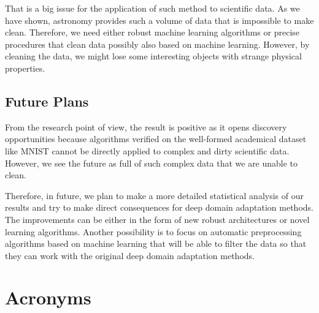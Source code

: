 \documentclass[thesis=M,english]{FITthesis}[2012/10/20]
\begin{document}
That is a big issue for the application of such method to scientific data.
As we have shown, astronomy provides such a volume of data that is impossible to make clean.
Therefore, we need either robust machine learning algorithms or precise procedures
that clean data possibly also based on machine learning.
However, by cleaning the data, we might lose some interesting objects with strange physical properties.

\section{Future Plans}

From the research point of view, the result is positive as it opens discovery opportunities because algorithms verified on the well-formed academical dataset like MNIST cannot be directly applied to complex and dirty scientific data. However, we see the future as full of such complex data that we are unable to clean.

Therefore, in future, we plan to make a more detailed statistical analysis of our results and try to make direct consequences for deep domain adaptation methods. The improvements can be either in the form of new robust architectures or novel learning algorithms. Another possibility is to focus on automatic preprocessing algorithms based on machine learning that will be able to filter the data so that they can work with the original deep domain adaptation methods.




\appendix



\chapter{Acronyms}
\end{document}
